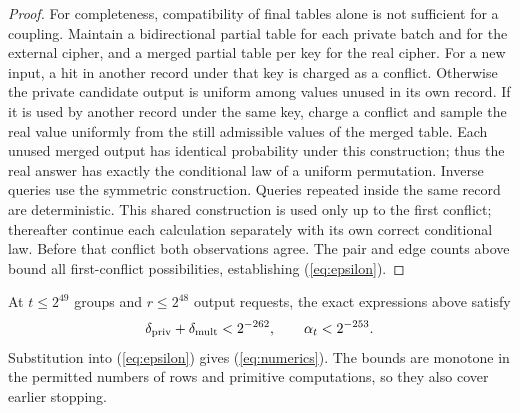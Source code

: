 \documentclass[journal=tosc,preprint,floatrow,nohyperxmp]{iacrtrans}
\newif\ifjordireview
\newcounter{jordinote}
\newcommand{\jordinote}[2]{%
  \ifjordireview
  \stepcounter{jordinote}\par\medskip\noindent
  \fcolorbox{blue!55!black}{blue!4}{%
    \begin{minipage}{\dimexpr\linewidth-2\fboxsep-2\fboxrule\relax}
    \small\raggedright\color{blue!45!black}
    \textbf{Solo Jordi -- J\thejordinote: #1}\par\smallskip
    #2
    \end{minipage}}\par\medskip
  \fi
}
\numberwithin{lemma}{section}
\numberwithin{proposition}{section}
\numberwithin{equation}{section}
\theoremstyle{definition}
\numberwithin{definition}{section}
\theoremstyle{plain}
\begin{document}
\begin{proof}
For completeness, compatibility of final tables alone is not sufficient for a coupling. Maintain a bidirectional partial table for each private batch and for the external cipher, and a merged partial table per key for the real cipher. For a new input, a hit in another record under that key is charged as a conflict. Otherwise the private candidate output is uniform among values unused in its own record. If it is used by another record under the same key, charge a conflict and sample the real value uniformly from the still admissible values of the merged table. Each unused merged output has identical probability under this construction; thus the real answer has exactly the conditional law of a uniform permutation. Inverse queries use the symmetric construction. Queries repeated inside the same record are deterministic. This shared construction is used only up to the first conflict; thereafter continue each calculation separately with its own correct conditional law. Before that conflict both observations agree. The pair and edge counts above bound all first-conflict possibilities, establishing (\ref{eq:epsilon}).
\end{proof}

\jordinote{El acoplamiento debe ser secuencial}{Que las tablas finales sean compatibles no demuestra por sí solo que las dos ejecuciones tengan las distribuciones correctas. Revisa el muestreo de cada nueva arista, las consultas inversas, los aciertos en tablas anteriores y qué ocurre al primer conflicto. Antes de ese evento deben coincidir las observaciones y cada marginal debe seguir siendo la de una permutación uniforme.}

At $t\le2^{49}$ groups and $r\le2^{48}$ output requests, the exact expressions above satisfy
\[
 \delta_{\rm priv}+\delta_{\rm mult}<2^{-262},\qquad \alpha_t<2^{-253}.
\]
Substitution into (\ref{eq:epsilon}) gives (\ref{eq:numerics}). The bounds are monotone in the permitted numbers of rows and primitive computations, so they also cover earlier stopping.
\end{document}
